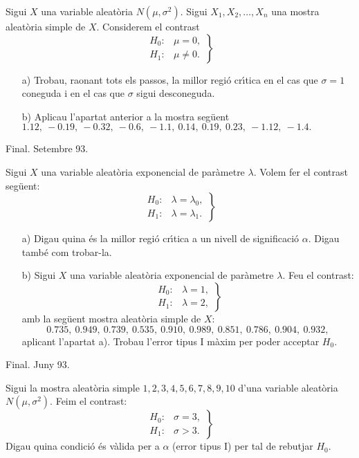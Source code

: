 \begin{prob}
{Sigui $X$ una variable aleat\`oria $N(\mu,\sigma^2)$. Sigui $X_1,X_2,\ldots,X_n$ una mostra aleat\`oria simple
de $X$. Considerem el contrast
$$\left.
\begin{array}{ll}
H_0 :& \mu=0,\\ H_1:&\mu\not =0.
\end{array}
\right\}$$
\begin{itemize}
\item[a)]{Trobau, raonant tots els passos, la millor regi\'o 
cr\'{\i}tica en el cas
que $\sigma=1$ coneguda i en el cas que $\sigma$ sigui desconeguda.}
\item[b)]{Aplicau l'apartat anterior a la mostra seg\"uent\newline
$1.12,\ -0.19,\ -0.32,\ -0.6,\ -1.1,\ 0.14,\ 0.19,\ 0.23,\ -1.12,\
-1.4.$}
\end{itemize}

{\footnotesize Final. Setembre 93.}}
\end{prob}

\newpage

\begin{prob}
{Sigui $X$ una variable aleat\`oria exponencial de par\`ametre
$\lambda$. Volem fer el contrast seg\"uent: 
$$\left.
\begin{array}{ll}
H_0 :& 
\lambda=\lambda_0,\\ H_1 :&  \lambda=\lambda_1.
\end{array}
\right\}$$
\begin{itemize}
\item[a)] {Digau quina \'es la millor regi\'o cr\'{\i}tica a 
un nivell de significaci\'o
$\alpha$. Digau tamb\'e com trobar-la.}
\item[b)] {Sigui $X$ una variable aleat\`oria exponencial 
de par\`ametre $\lambda$.
Feu el contrast:
$$\left.
\begin{array}{ll}
H_0 :&  \lambda=1,\\ H_1  :& 
\lambda=2,
\end{array}
\right\}$$
amb la seg\"uent mostra aleat\`oria simple de $X$:
$$0.735,\ 0.949,\ 0.739,\ 0.535,\ 0.910,\ 0.989,\ 0.851,\
0.786,\ 0.904,\ 0.932,$$
aplicant l'apartat a). Trobau l'error tipus I m\`axim per poder acceptar
$H_0$.
}
\end{itemize}

{\footnotesize Final. Juny 93.}}
\end{prob}

\begin{prob}
{Sigui la mostra aleat\`oria simple $1,2,3,4,5,6,7,8,9,10$ d'una
variable aleat\`oria $N(\mu,\sigma^2)$. Feim el contrast:
$$\left.
\begin{array}{ll}
H_0 :& \sigma =3, \\ H_1 :&  \sigma >3.
\end{array}
\right\}$$
Digau quina condici\'o \'es v\`alida per a $\alpha$ (error tipus
I) per tal de rebutjar $H_0$.
\newline{\footnotesize Final. Setembre 94.}}
\end{prob}

